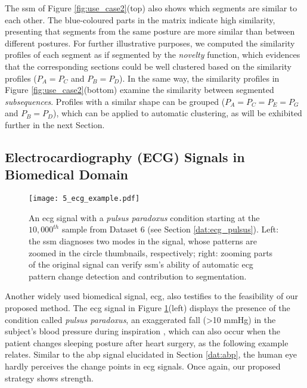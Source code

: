 The \gls{ssm} of Figure \ref{fig:use_case2}(top) also shows which segments are similar to each other. The blue-coloured parts in the matrix indicate high similarity, presenting that segments from the same posture are more similar than between different postures. For further illustrative purposes, we computed the similarity profiles of each segment as if segmented by the \textit{novelty} function, which evidences that the corresponding sections could be well clustered based on the similarity profiles ($P_A = P_C$ and $P_B=P_D$). In the same way, the similarity profiles in Figure \ref{fig:use_case2}(bottom) examine the similarity between segmented \textit{subsequences}. Profiles with a similar shape can be grouped ($P_A=P_C=P_E=P_G$ and $P_B=P_D$), which can be applied to automatic clustering, as will be exhibited further in the next Section.

\subsection{Electrocardiography (ECG) Signals in Biomedical Domain}
\label{sec:ecg_example}

\begin{figure}
    \centering
    \texttt{[image: 5\_ecg\_example.pdf]}
    \caption{An \gls{ecg} signal with a \textit{pulsus paradoxus} condition starting at the $10,000^{th}$ sample from Dataset 6 (see Section \ref{dat:ecg_pulsus}). Left: the \gls{ssm} diagnoses two modes in the signal, whose patterns are zoomed in the circle thumbnails, respectively; right: zooming parts of the original signal can verify \gls{ssm}'s ability of automatic \gls{ecg} pattern change detection and contribution to segmentation.}
    \label{fig:use_case3}
\end{figure}

Another widely used biomedical signal, \gls{ecg}, also testifies to the feasibility of our proposed method. The \gls{ecg} signal in Figure \ref{fig:use_case3}(left) displays the presence of the condition called \textit{pulsus paradoxus}, an exaggerated fall (>10 mmHg) in the subject's blood pressure during inspiration \cite{pulsusparadoxus2}, which can also occur when the patient changes sleeping posture after heart surgery\cite{eamonn_segmentation}, as the following example relates. Similar to the \gls{abp} signal elucidated in Section \ref{dat:abp}, the human eye hardly perceives the change points in \gls{ecg} signals. Once again, our proposed strategy shows strength.

